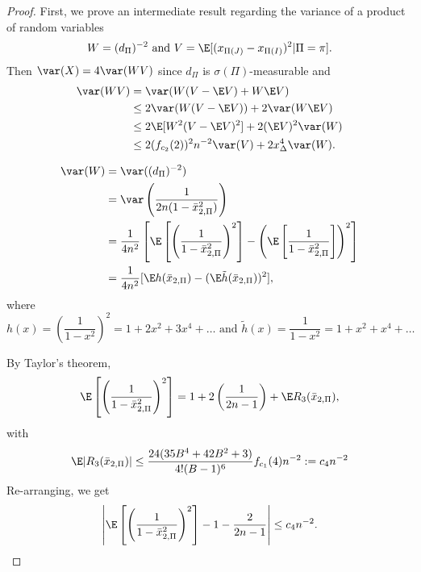 \begin{proof}
  First, we prove an intermediate result regarding the variance of a product of random variables
  \begin{equation*}
    W = (d_{\Pi})^{-2} \text{ and } V = \E [(x_{\Pi(J)} - x_{\Pi(I)})^2 | \Pi = \pi].
  \end{equation*}
  Then $\var(X) = 4 \var(WV)$ since $d_{\Pi}$ is $\sigma(\Pi)$-measurable and
  \begin{align}
    \label{E:var_prod}
    \var(WV) &= \var(W(V-\E V) + W \E V) \nonumber \\
    &\leq 2\var(W(V-\E V)) + 2 \var (W \E V) \nonumber \\
    &\leq 2 \E [W^2 (V-\E V)^2] + 2(\E V)^2 \var(W) \nonumber \\
    &\leq 2(f_{c_2}(2))^2 n^{-2} \var(V) + 2x_{\Delta}^4 \var(W).
  \end{align}

  \begin{align*}
    \var(W) &= \var ((d_{\Pi})^{-2}) \\
    &= \var \left ( \frac{1}{2n(1-\bar{x}_{2,\Pi}^2)} \right ) \\
    &= \frac{1}{4n^2} \left [ \E \left [ \left (\frac{1}{1-\bar{x}_{2,\Pi}^2}
        \right )^2 \right ] -
      \left ( \E \left [ \frac{1}{1-\bar{x}_{2,\Pi}^2} \right ] \right )^2
    \right ] \\
    &= \frac{1}{4n^2}[\E h(\bar{x}_{2,\Pi}) - (\E \tilde{h}(\bar{x}_{2,\Pi}))^2],
  \end{align*}
  where
  \begin{equation*}
    h(x) = \left ( \frac{1}{1-x^2} \right )^2 = 1 + 2x^2 + 3x^4 + \dots
      \text{ and } \tilde{h}(x) = \frac{1}{1-x^2} = 1 + x^2 + x^4 + \ldots
  \end{equation*}

  By Taylor's theorem,
  \begin{equation*}
    \E \left [ \left (\frac{1}{1-\bar{x}_{2,\Pi}^2} \right )^2 \right ]
    = 1 + 2 \left ( \frac{1}{2n-1} \right ) + \E R_3(\bar{x}_{2,\Pi}),
  \end{equation*}
  with
  \begin{equation*}
    \E |R_3(\bar{x}_{2,\Pi})| \leq \frac{24(35B^4 + 42 B^2 + 3)}{4!(B-1)^6}f_{c_1}(4) n^{-2}
    := c_4 n^{-2}
  \end{equation*}
  Re-arranging, we get
  \begin{equation*}
    \left | \E \left [ \left (\frac{1}{1-\bar{x}_{2,\Pi}^2} \right )^2 \right ]
      - 1 - \frac{2}{2n-1} \right | \leq c_4 n^{-2}.
  \end{equation*}


\end{proof}
